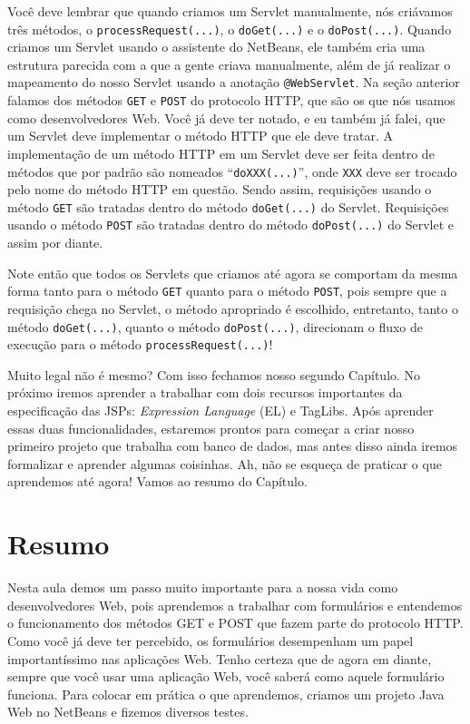 Você deve lembrar que quando criamos um Servlet manualmente, nós criávamos três métodos, o \texttt{processRequest(...)}, o \texttt{doGet(...)} e o \texttt{doPost(...)}. Quando criamos um Servlet usando o assistente do NetBeans, ele também cria uma estrutura parecida com a que a gente criava manualmente, além de já realizar o mapeamento do nosso Servlet usando a anotação \texttt{@WebServlet}. Na seção anterior falamos dos métodos \texttt{GET} e \texttt{POST} do protocolo HTTP, que são os que nós usamos como desenvolvedores Web. Você já deve ter notado, e eu também já falei, que um Servlet deve implementar o método HTTP que ele deve tratar. A implementação de um método HTTP em um Servlet deve ser feita dentro de métodos que por padrão são nomeados ``\texttt{doXXX(...)}'', onde \texttt{XXX} deve ser trocado pelo nome do método HTTP em questão. Sendo assim, requisições usando o método \texttt{GET} são tratadas dentro do método \texttt{doGet(...)} do Servlet. Requisições usando o método \texttt{POST} são tratadas dentro do método \texttt{doPost(...)} do Servlet e assim por diante.

Note então que todos os Servlets que criamos até agora se comportam da mesma forma tanto para o método \texttt{GET} quanto para o método \texttt{POST}, pois sempre que a requisição chega no Servlet, o método apropriado é escolhido, entretanto, tanto o método \texttt{doGet(...)}, quanto o método \texttt{doPost(...)}, direcionam o fluxo de execução para o método \texttt{processRequest(...)}!
 
Muito legal não é mesmo? Com isso fechamos nosso segundo Capítulo. No próximo iremos aprender a trabalhar com dois recursos importantes da especificação das JSPs: \textit{Expression Language} (EL) e TagLibs. Após aprender essas duas funcionalidades, estaremos prontos para começar a criar nosso primeiro projeto que trabalha com banco de dados, mas antes disso ainda iremos formalizar e aprender algumas coisinhas. Ah, não se esqueça de praticar o que aprendemos até agora! Vamos ao resumo do Capítulo.


\section{Resumo}

Nesta aula demos um passo muito importante para a nossa vida como desenvolvedores Web, pois aprendemos a trabalhar com formulários e entendemos o funcionamento dos métodos GET e POST que fazem parte do protocolo HTTP. Como você já deve ter percebido, os formulários desempenham um papel importantíssimo nas aplicações Web. Tenho certeza que de agora em diante, sempre que você usar uma aplicação Web, você saberá como aquele formulário funciona. Para colocar em prática o que aprendemos, criamos um projeto Java Web no NetBeans e fizemos diversos testes.

